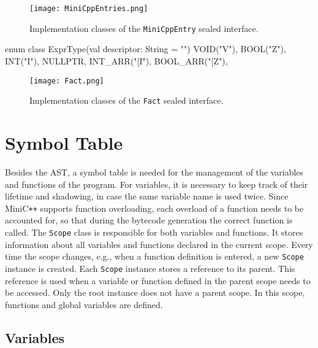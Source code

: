 \begin{figure}[]
       \centering
       \texttt{[image: MiniCppEntries.png]}
       \caption{Implementation classes of the \texttt{MiniCppEntry} sealed interface.}
       \label{fig:MiniCppEntriesDiag}
\end{figure}

\begin{KotlinCode}[float,numbers=none,caption=Implementation of the \texttt{ExprType} enum., label=lst:ListExprType]
       enum class ExprType(val descriptor: String = "") {
              VOID("V"),
              BOOL("Z"),
              INT("I"),
              NULLPTR,
              INT_ARR("[I"),
              BOOL_ARR("[Z"),
          }
\end{KotlinCode}

\begin{figure}[]
       \centering
       \texttt{[image: Fact.png]}
       \caption{Implementation classes of the \texttt{Fact} sealed interface.}
       \label{fig:FactDiag}
\end{figure}


\section{Symbol Table}

Besides the AST, a symbol table is needed for the management of the variables and functions of the program. For variables, it is necessary to keep track of their lifetime and shadowing, in case the same variable name is used twice. Since MiniC\verb|++| supports function overloading, each overload of a function needs to be accounted for, so that during the bytecode generation the correct function is called. The \verb|Scope| class is responsible for both variables and functions. It stores information about all variables and functions declared in the current scope. Every time the scope changes, e.g., when a function definition is entered, a new \verb|Scope| instance is created. Each \verb|Scope| instance stores a reference to its parent. This reference is used when a variable or function defined in the parent scope needs to be accessed. Only the root instance does not have a parent scope. In this scope, functions and global variables are defined.

\subsection{Variables}


